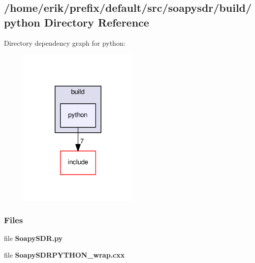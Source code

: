 \subsection{/home/erik/prefix/default/src/soapysdr/build/python Directory Reference}
\label{dir_bdbe2d44e3e0d5c7798c91daa47c6b26}
Directory dependency graph for python\+:
\nopagebreak
\begin{figure}[H]
\begin{center}
\leavevmode
\includegraphics[width=166pt]{dir_bdbe2d44e3e0d5c7798c91daa47c6b26_dep}
\end{center}
\end{figure}
\subsubsection*{Files}
\begin{DoxyCompactItemize}
\item 
file {\bf Soapy\+S\+D\+R.\+py}
\item 
file {\bf Soapy\+S\+D\+R\+P\+Y\+T\+H\+O\+N\+\_\+wrap.\+cxx}
\end{DoxyCompactItemize}
